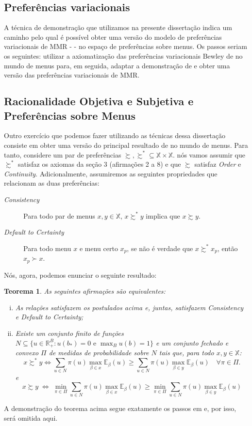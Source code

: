 \documentclass[12pt, a4paper]{article}
\theoremstyle{nonumberplain}
\theoremstyle{plain}
\newtheorem{theorem}{Teorema}
\theoremstyle{plain}
\theoremstyle{plain}
\theoremstyle{nonumberplain}
\begin{document}
\subsection{Preferências variacionais}
A técnica de demonstração que utilizamos na presente dissertação indica um caminho pelo qual é possível obter uma versão do modelo de preferências variacionais de MMR - \cite{Maccheroni2006} - no espaço de preferências sobre menus. Os passos seriam os seguintes: utilizar a axiomatização das preferências variacionais Bewley de \cite{Faro2015} no mundo de menus para, em seguida, adaptar a demonstração de \cite{Brotherhood2014} e obter uma versão das preferências variacionais de MMR.

\subsection{Racionalidade Objetiva e Subjetiva e Preferências sobre Menus}
Outro exercício que podemos fazer utilizando as técnicas dessa dissertação consiste em obter uma versão do principal resultado de \cite{Gilboa2010} no mundo de menus. Para tanto, considere um par de preferências $\succsim, \succsim^*\subseteq\mathbb{X}\times\mathbb{X}$. nós vamos assumir que $\succsim^*$ satisfaz os axiomas da seção 3 (afirmações 2 a 8) e que $\succsim$ satisfaz \emph{Order} e \emph{Continuity}. Adicionalmente, assumiremos as seguintes propriedades que relacionam as duas preferências:
\begin{description}
\item [\textit{Consistency}] Para todo par de menus $x,y\in\mathbb{X}$, $x\succsim^*y$ implica que $x\succsim y$.
\item[\textit{Default to Certainty}] Para todo menu $x$ e menu certo $x_p$, se não é verdade que $x\succsim^* x_p$, então $x_p \succ x$.
\end{description}
Nós, agora, podemos enunciar o seguinte resultado:\\
\begin{theorem}
As seguintes afirmações são equivalentes:
\begin{enumerate}[(i)]
\item As relações satisfazem os postulados acima e, juntas, satisfazem \emph{Consistency} e \emph{Default to Certainty};
\item Existe um conjunto finito de funções $N\subseteq\{u \in \mathbb{R}^B_+:u(b_*)=0\text { e }\max_{B}u(b)=1\}$ e um conjunto fechado e convexo $\Pi$ de medidas de probabilidade sobre $N$ tais que, para todo $x,y\in\mathbb{X}$:
$$x\succsim^* y \Leftrightarrow \sum_{u\in N} \pi(u)\max_{\beta\in x}\mathbb{E}_\beta(u) \geq \sum_{u\in N} \pi(u)\max_{\beta\in y}\mathbb{E}_\beta(u)\quad \forall\pi\in\Pi.$$
e
\[x \succsim y \;\Leftrightarrow\; \min_{\pi\in\Pi}\sum_{u\in N} \pi(u)\max_{\beta\in x}\mathbb{E}_\beta(u)\geq \min_{\pi\in\Pi}\sum_{u\in N} \pi(u)\max_{\beta\in y}\mathbb{E}_\beta(u)\]
\end{enumerate}
\end{theorem}
\noindent
A demonstração do teorema acima segue exatamente os passos em \cite{Gilboa2010} e, por isso, será omitida aqui.
\end{document}

